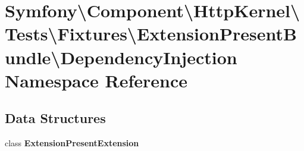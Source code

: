 \section{Symfony\textbackslash{}Component\textbackslash{}Http\+Kernel\textbackslash{}Tests\textbackslash{}Fixtures\textbackslash{}Extension\+Present\+Bundle\textbackslash{}Dependency\+Injection Namespace Reference}
\label{namespace_symfony_1_1_component_1_1_http_kernel_1_1_tests_1_1_fixtures_1_1_extension_present_bundle_1_1_dependency_injection}
\subsection*{Data Structures}
\begin{DoxyCompactItemize}
\item 
class {\bf Extension\+Present\+Extension}
\end{DoxyCompactItemize}
